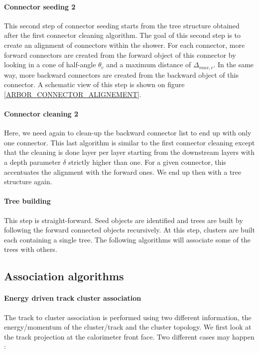 \documentclass[cits]{JINST}
\begin{document}
\paragraph*{Connector seeding 2} This second step of connector seeding starts from the tree structure obtained after the first connector cleaning algorithm. The goal of this second step is to create an alignment of connectors within the shower. For each connector, more forward connectors are created from the forward object of this connector by looking in a cone of half-angle $\theta_c$ and a maximum distance of $\Delta_{max,c}$. In the same way, more backward connectors are created from the backward object of this connector. A schematic view of this step is shown on figure \ref{ARBOR_CONNECTOR_ALIGNEMENT}.

\paragraph*{Connector cleaning 2} Here, we need again to clean-up the backward connector list to end up with only one connector. This last algorithm is similar to the first connector cleaning except that the cleaning is done layer per layer starting from the downstream layers with a depth parameter $\delta$ strictly higher than one. For a given connector, this accentuates the alignment with the forward ones. We end up then with a tree structure again.

\paragraph*{Tree building} This step is straight-forward. Seed objects are identified and trees are built by following the forward connected objects recursively. At this step, clusters are built each containing a single tree. The following algorithms will associate some of the trees with others.

\subsection{Association algorithms}

\paragraph*{Energy driven track cluster association} The track to cluster association is performed using two different information, the energy/momentum of the cluster/track and the cluster topology. We first look at the track projection at the calorimeter front face. Two different cases may happen :
\end{document}
